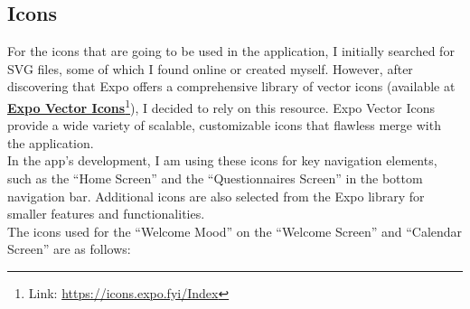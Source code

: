 \subsection{Icons}

For the icons that are going to be used in the application, I initially searched for SVG files, some of which I found online or created myself. However, after discovering that Expo offers a comprehensive library of vector icons (available at \textbf{\href{https://icons.expo.fyi/Index}{Expo Vector Icons}}\footnote{Link: \url{https://icons.expo.fyi/Index}}), I decided to rely on this resource. Expo Vector Icons provide a wide variety of scalable, customizable icons that flawless merge with the application.\vspace{5mm} \\
In the app's development, I am using these icons for key navigation elements, such as the ``Home Screen'' and the ``Questionnaires Screen'' in the bottom navigation bar. Additional icons are also selected from the Expo library for smaller features and functionalities.\vspace{5mm} \\
The icons used for the ``Welcome Mood'' on the ``Welcome Screen'' and ``Calendar Screen'' are as follows:

